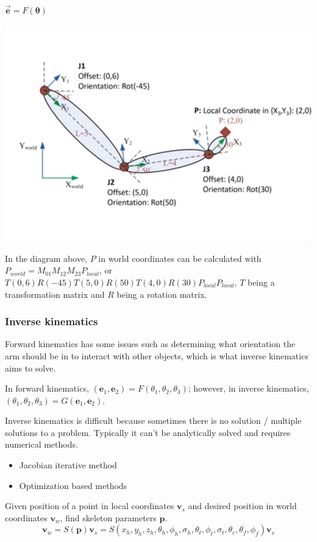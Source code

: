 \documentclass[12pt]{article}
\begin{document}
$\vec{\bm e} = F(\bm \theta)$

\includegraphics[scale=2]{images/arm.png}

In the diagram above, $P$ in world coordinates can be calculated with
$P_{world} = M_{01}M_{12}M_{23}P_{local}$, or $T(0,6)R(-45)T(5,0)R(50)
T(4,0)R(30)P_{local}P_{local}$, $T$ being a transformation matrix and $R$
being a rotation matrix.

\subsubsection{Inverse kinematics}

Forward kinematics has some issues such as determining what orientation
the arm should be in to interact with other objects, which is what
inverse kinematics aims to solve.

In forward kinematics, $(\bm e_1,\bm e_2) = F(\theta_1,\theta_2,\theta_3)$;
however, in inverse kinematics, $(\theta_1,\theta_2,\theta_3) = G(\bm e_1,
\bm e_2)$.

Inverse kinematics is difficult because sometimes there is no solution / multiple
solutions to a problem. Typically it can't be analytically solved and requires numerical methods.
\begin{itemize}
    \item Jacobian iterative method
    \item Optimization based methods
\end{itemize}

Given position of a point in local coordinates $\bm v_s$ and desired
position in world coordinates $\bm v_w$, find skeleton parameters
$\bm p$.
\[ \bm v_w = S(\bm p)\bm v_s = S(x_h,y_h,z_h,\theta_h,\phi_h,\sigma_h,
\theta_t,\phi_t,\sigma_t,\theta_c,\theta_f,\phi_f) \bm v_s \]
\end{document}
